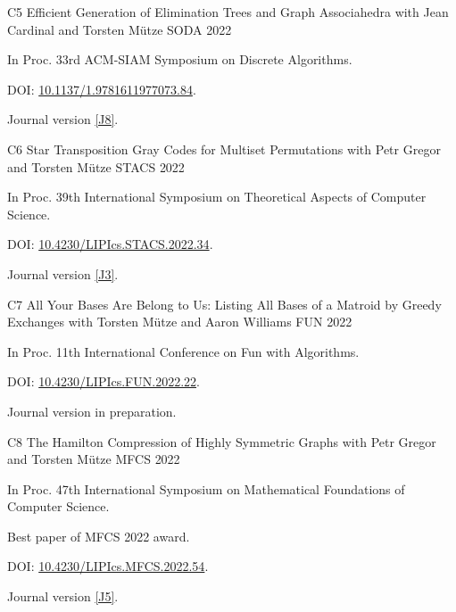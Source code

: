 \begin{cvpublications}
  \cvpublication
  {C5}
  {Efficient Generation of Elimination Trees and Graph Associahedra} %
  {with Jean Cardinal and Torsten Mütze} %
  {SODA} %
  {2022}
  {
  \begin{cvitems} %
    \item   In Proc. 33rd ACM-SIAM Symposium on Discrete Algorithms.
    \item[] DOI: \href{https://doi.org/10.1137/1.9781611977073.84}{10.1137/1.9781611977073.84}.
    \item   Journal version \hyperlink{paperJ8}{[J8]}.
  \end{cvitems}
  }
  
  \cvpublication
  {C6}
  {Star Transposition Gray Codes for Multiset Permutations} %
  {with Petr Gregor and Torsten Mütze} %
  {STACS} %
  {2022}
  {
  \begin{cvitems} %
    \item   In Proc. 39th International Symposium on Theoretical Aspects of Computer Science.
    \item[] DOI: \href{https://doi.org/10.4230/LIPIcs.STACS.2022.34}{10.4230/LIPIcs.STACS.2022.34}.
    \item   Journal version \hyperlink{paperJ3}{[J3]}.
  \end{cvitems}
  }
  
  \cvpublication
  {C7}
  {All Your Bases Are Belong to Us: Listing All Bases of a Matroid by Greedy Exchanges} %
  {with Torsten Mütze and Aaron Williams} %
  {FUN} %
  {2022}
  {
  \begin{cvitems} %
    \item   In Proc. 11th International Conference on Fun with Algorithms.
    \item[] DOI: \href{https://doi.org/10.4230/LIPIcs.FUN.2022.22}{10.4230/LIPIcs.FUN.2022.22}.
    \item   Journal version in preparation.
  \end{cvitems}
  }
  
  \cvpublication
  {C8}
  {The Hamilton Compression of Highly Symmetric Graphs} %
  {with Petr Gregor and Torsten Mütze} %
  {MFCS} %
  {2022}
  {
  \begin{cvitems} %
    \item In Proc. 47th International Symposium on Mathematical Foundations of Computer Science.
    \item[] Best paper of MFCS 2022 award.
    \item[] DOI: \href{https://doi.org/10.4230/LIPIcs.MFCS.2022.54}{10.4230/LIPIcs.MFCS.2022.54}.
    \item Journal version \hyperlink{paperJ5}{[J5]}.
  \end{cvitems}
  }
  

\end{cvpublications}
